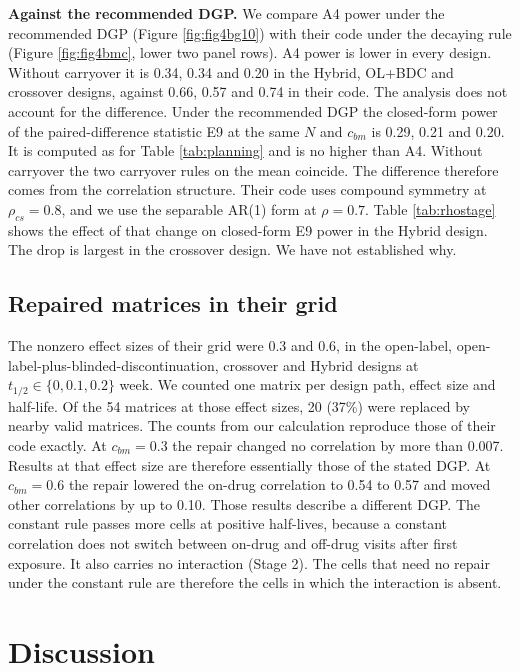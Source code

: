\documentclass[
  11pt,
]{article}
\begin{document}
\textbf{Against the recommended DGP.} We compare A4 power under the
recommended DGP (Figure \ref{fig:fig4bg10}) with their code under
the decaying rule (Figure \ref{fig:fig4bmc}, lower two panel rows).
A4 power is lower in every design. Without carryover it is
0.34, 0.34 and 0.20 in the Hybrid, OL+BDC and crossover designs, against
0.66, 0.57 and 0.74 in their code. The analysis does not account for the
difference. Under the recommended DGP the closed-form power of the
paired-difference statistic E9 at the same \(N\) and \(c_{bm}\) is
0.29, 0.21 and 0.20. It is computed as for Table \ref{tab:planning} and is
no higher than A4. Without carryover the two carryover rules on the
mean coincide. The difference therefore comes from the correlation
structure. Their code uses compound symmetry at \(\rho_{cs} = 0.8\), and
we use the separable AR(1) form at \(\rho = 0.7\). Table
\ref{tab:rhostage} shows the effect of that change on closed-form E9
power in the Hybrid design. The drop is largest in the crossover
design. We have not established why.

\subsection{Repaired matrices in their grid}\label{repaired-matrices-in-their-grid}

The nonzero effect sizes of their grid were 0.3 and 0.6, in the
open-label, open-label-plus-blinded-discontinuation, crossover and
Hybrid designs at \(t_{1/2} \in \{0, 0.1, 0.2\}\) week. We counted one
matrix per design path, effect size and half-life. Of the 54 matrices
at those effect sizes, 20 (37\%) were replaced by nearby valid
matrices. The counts from our calculation reproduce those of their
code exactly. At \(c_{bm} = 0.3\) the repair changed no correlation by
more than 0.007. Results at that effect size are therefore essentially
those of the stated DGP. At \(c_{bm} = 0.6\) the repair lowered the
on-drug correlation to 0.54 to 0.57 and moved other correlations by up
to 0.10. Those results describe a different DGP. The constant rule
passes more cells at positive half-lives, because a constant
correlation does not switch between on-drug and off-drug visits after
first exposure. It also carries no interaction (Stage 2). The cells
that need no repair under the constant rule are therefore the cells
in which the interaction is
absent.

\section{Discussion}\label{discussion}
\end{document}
